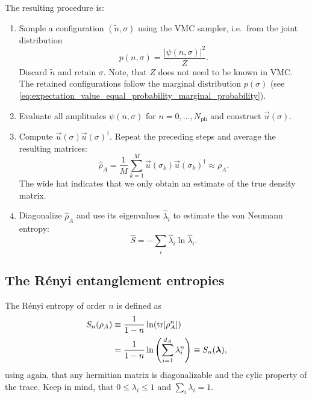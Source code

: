 \documentclass[../../main.tex]{subfiles}
\begin{document}
The resulting procedure is:
\begin{enumerate}
\item Sample a configuration $(\tilde n,\sigma)$ using the VMC sampler,
      i.e.\ from the joint distribution
      \begin{equation}
      p(n,\sigma)=\frac{|\psi(n,\sigma)|^2}{Z}.
      \end{equation}
      Discard $\tilde n$ and retain $\sigma$. Note, that $Z$ does not need to be known in VMC. The retained configurations follow the marginal distribution $p(\sigma)$ (see \cref{eq:expectation_value_equal_probability_marginal_probability}).
\item Evaluate all amplitudes $\psi(n,\sigma)$ for
      $n=0,\dots,N_{\mathrm{ph}}$ and construct $\vec u(\sigma)$.
\item Compute $\vec u(\sigma)\vec u(\sigma)^\dagger$.
      Repeat the preceding steps and average the resulting matrices:
      \begin{equation}
      \widehat\rho_A=
      \frac{1}{M}\sum_{k=1}^{M}
      \vec u(\sigma_k)\vec u(\sigma_k)^\dagger
      \approx\rho_A.
      \end{equation}
      The wide hat indicates that we only obtain an estimate of the true density matrix.
\item Diagonalize $\widehat\rho_A$ and use its eigenvalues
      $\widehat\lambda_i$ to estimate the von Neumann entropy:
      \begin{equation}
      \widehat S=-\sum_i\widehat\lambda_i\ln\widehat\lambda_i.
      \end{equation}
\end{enumerate}

\subsection{The Rényi entanglement entropies}

The Rényi entropy of order $n$ is defined as
\begin{align}
      S_n(\rho_A) &\equiv \frac{1}{1-n} \ln (\operatorname{tr}[\rho_A^n]) \\
      &=  \frac{1}{1-n} \ln \left( \sum_{i=1}^{d_A} \lambda_i^n \right) \equiv S_n(\bm{\lambda}), \label{eq:renyi_entropy_from_eigenvalues}
\end{align}
using again, that any hermitian matrix is diagonalizable and the cylic property of the trace. Keep in mind, that $0 \leq \lambda_i \leq 1$ and $\sum_i \lambda_i = 1$.
\end{document}
